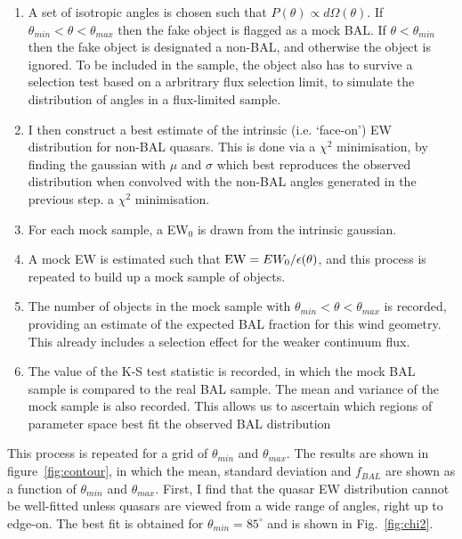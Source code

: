 \begin{enumerate}
	\setlength\itemsep{1em}
	\item A set of isotropic angles is chosen such that $P(\theta)\propto d\Omega(\theta)$.
	If $\theta_{min}<\theta<\theta_{max}$ then the fake object is flagged as a mock BAL. 
	If $\theta<\theta_{min}$ then the fake object is designated a non-BAL, and otherwise
	the object is ignored. To be included in the sample, the object also has to 
	survive a selection test based on a arbritrary flux selection limit, to simulate the
	distribution of angles in a flux-limited sample.
	\item I then construct a best estimate of the intrinsic (i.e. `face-on')
	EW distribution for non-BAL quasars. This is done via a $\chi^2$ minimisation,
	by finding the gaussian with $\mu$ and $\sigma$ which best 
	reproduces the observed distribution when convolved with
	the non-BAL angles generated in the previous step. 
	a $\chi^2$ minimisation.
	\item For each mock sample, a EW$_0$ is drawn from the intrinsic gaussian.
	\item A mock EW is estimated such that ${\rm EW} = EW_0 / \epsilon(\theta)$,
	and this process is repeated to build up a mock sample of objects.
	\item The number of objects in the mock sample with 
	$\theta_{min}<\theta<\theta_{max}$ is recorded, providing an 
	estimate of the expected BAL fraction for this wind geometry. 
	This already includes a selection effect for the weaker continuum flux.
	\item The value of the K-S test statistic is recorded, in which the 
	mock BAL sample is compared to the real BAL sample. The 
	mean and variance of the mock sample is also recorded. 
	This allows us to ascertain which regions
	of parameter space best fit the observed BAL distribution
\end{enumerate}

This process is repeated for a grid of $\theta_{min}$ and $\theta_{max}$. The 
results are shown in figure~\ref{fig:contour}, in which the mean, 
standard deviation and $f_{BAL}$ are shown as a function of $\theta_{min}$ 
and $\theta_{max}$. First, I find that the quasar EW distribution
cannot be well-fitted unless quasars are viewed from a wide range of angles,
right up to edge-on. The best fit is obtained for $\theta_{min}=85^\circ$ and
is shown in Fig.~\ref{fig:chi2}.

